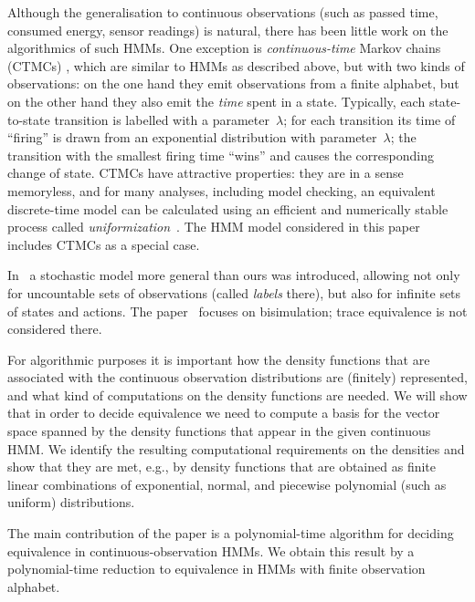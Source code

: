 \documentclass[a4paper,UKenglish,cleveref, autoref,mathscr]{lipics-v2019}
\newcommand{\RR}{\mathbb{R}}
\newcommand{\1}{\mathbbm{1}}
\begin{document}
Although the generalisation to continuous observations (such as passed time, consumed energy, sensor readings) is natural, there has been little work on the algorithmics of such HMMs.
One exception is \emph{continuous-time} Markov chains (CTMCs) \cite{BHHK03,CDKM11}, which are similar to HMMs as described above, but with two kinds of observations: on the one hand they emit observations from a finite alphabet, but on the other hand they also emit the \emph{time} spent in a state.
Typically, each state-to-state transition is labelled with a parameter~$\lambda$; for each transition its time of ``firing'' is drawn from an exponential distribution with parameter~$\lambda$; the transition with the smallest firing time ``wins'' and causes the corresponding change of state.
CTMCs have attractive properties: they are in a sense memoryless, and for many analyses, including model checking, an equivalent discrete-time model can be calculated using an efficient and numerically stable process called \emph{uniformization}~\cite{Grassmann91}.
The HMM model considered in this paper includes CTMCs as a special case.

In~\cite{HKK14} a stochastic model more general than ours was introduced, allowing not only for uncountable sets of observations (called \emph{labels} there), but also for infinite sets of states and actions.
The paper~\cite{HKK14} focuses on bisimulation; trace equivalence is not considered there.

For algorithmic purposes it is important how the density functions that are associated with the continuous observation distributions are (finitely) represented, and what kind of computations on the density functions are needed.
We will show that in order to decide equivalence we need to compute a basis for the vector space spanned by the density functions that appear in the given continuous HMM.
We identify the resulting computational requirements on the densities and show that they are met, e.g., by density functions that are obtained as finite linear combinations of exponential, normal, and piecewise polynomial (such as uniform) distributions.

The main contribution of the paper is a polynomial-time algorithm for deciding equivalence in continuous-observation HMMs.
We obtain this result by a polynomial-time reduction to equivalence in HMMs with finite observation alphabet.



\end{document}
